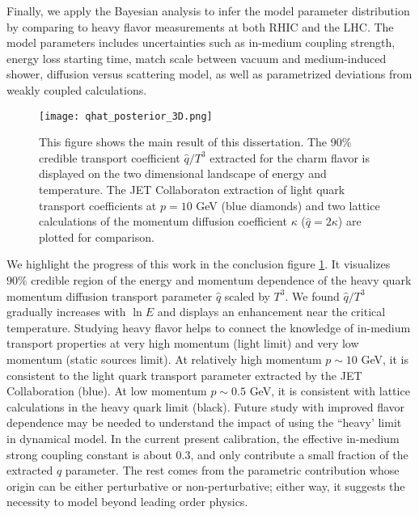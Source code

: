 Finally, we apply the Bayesian analysis to infer the model parameter distribution by comparing to heavy flavor measurements at both RHIC and the LHC.
The model parameters includes uncertainties such as in-medium coupling strength, energy loss starting time, match scale between vacuum and medium-induced shower, diffusion versus scattering model, as well as parametrized deviations from weakly coupled calculations.

\begin{figure}
\centering
\texttt{[image: qhat\_posterior\_3D.png]}
\caption{This figure shows the main result of this dissertation. The 90\% credible transport coefficient $\hat{q}/T^3$ extracted for the charm flavor is displayed on the two dimensional landscape of energy and temperature. The JET Collaboraton extraction of light quark transport coefficients at $p=10$ GeV \cite{Burke:2013yra} (blue diamonds) and two lattice calculations of the momentum diffusion coefficient $\kappa$ ($\hat{q}=2\kappa$) \cite{Ding:2012sp,Banerjee:2011ra} are plotted for comparison.}
\label{fig:conlusion}
\end{figure}

We highlight the progress of this work in the conclusion figure \ref{fig:conlusion}.
It visualizes $90\%$ credible region of the energy and momentum dependence of the heavy quark momentum diffusion transport parameter $\hat{q}$ scaled by $T^3$.
We found $\hat{q}/T^3$ gradually increases with $\ln E$ and displays an enhancement near the critical temperature.
Studying heavy flavor helps to connect the knowledge of in-medium transport properties at very high momentum (light limit) and very low momentum (static sources limit).
At relatively high momentum $p\sim 10$ GeV, it is consistent to the light quark transport parameter extracted by the JET Collaboration (blue).
At low momentum $p\sim 0.5$ GeV, it is consistent with lattice calculations in the heavy quark limit (black).
Future study with improved flavor dependence may be needed to understand the impact of using the ``heavy' limit in dynamical model.
In the current present calibration, the effective in-medium strong coupling constant is about $0.3$, and only contribute a small fraction of the extracted $\hat{q}$ parameter.
The rest comes from the parametric contribution whose origin can be either perturbative or non-perturbative; either way, it suggests the necessity to model beyond leading order physics.

